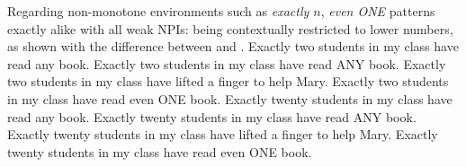 Regarding non-monotone environments such as \textit{exactly $n$}, \textit{even \MakeUppercase{one}} patterns exactly alike with all weak NPIs: being contextually restricted to lower numbers, as shown with the difference between  and .
\pex\label{ex:even-nm-okay}
\a Exactly two students in my class have read any book.
\a Exactly two students in my class have read \MakeUppercase{any} book.
\a Exactly two students in my class have lifted a finger to help Mary.
\a Exactly two students in my class have read even \MakeUppercase{one} book.
\xe
\pex\label{ex:even-nm-bad}
\a\ljudge{\#} Exactly twenty students in my class have read any book.
\a\ljudge{\#} Exactly twenty students in my class have read \MakeUppercase{any} book.
\a\ljudge{\#} Exactly twenty students in my class have lifted a finger to help Mary.
\a\ljudge{\#} Exactly twenty students in my class have read even \MakeUppercase{one} book.
\xe

